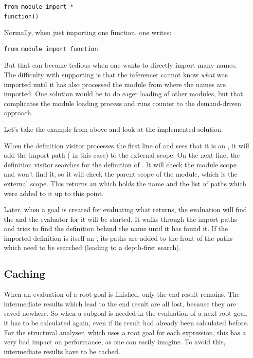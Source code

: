 \documentclass[12pt,halfparskip,DIV11,BCOR10mm]{scrreprt}
\begin{document}
\begin{lstlisting}
from module import *
function()
\end{lstlisting}

Normally, when just importing one function, one writes:

\begin{lstlisting}
from module import function
\end{lstlisting}

But that can become tedious when one wants to directly import many names. The difficulty with supporting  is that the inferencer cannot know \emph{what} was imported until it has also processed the module from where the names are imported. One solution would be to do eager loading of other modules, but that complicates the module loading process and runs counter to the demand-driven approach.

Let's take the example from above and look at the implemented solution.

When the definition visitor processes the first line of  and sees that it is an , it will add the import path ( in this case) to the external scope. On the next line, the definition visitor searches for the definition of . It will check the module scope and won't find it, so it will check the parent scope of the module, which is the external scope. This returns an  which holds the name and the list of  paths which were added to it up to this point.

Later, when a goal is created for evaluating what  returns, the evaluation will find the  and the evaluator for it will be started. It walks through the import paths and tries to find the definition behind the name  until it has found it. If the imported definition is itself an , its paths are added to the front of the paths which need to be searched (leading to a depth-first search).


\subsection{Caching}
\label{caching}

When an evaluation of a root goal is finished, only the end result remains. The intermediate results which lead to the end result are all lost, because they are saved nowhere. So when a subgoal is needed in the evaluation of a next root goal, it has to be calculated again, even if its result had already been calculated before. For the structural analyser, which uses a root goal for each expression, this has a very bad impact on performance, as one can easily imagine. To avoid this, intermediate results have to be cached.
\end{document}
